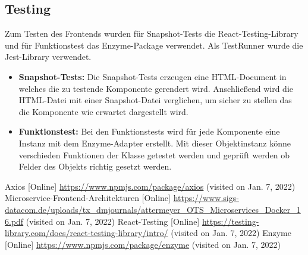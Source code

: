 \documentclass[conference]{IEEEtran}
\begin{document}
\subsection{Testing}
Zum Testen des Frontends wurden für Snapshot-Tests die React-Testing-Library\cite{reactTest} und für Funktionstest das Enzyme-Package\cite{enzyme} verwendet. 
Als TestRunner wurde die Jest-Library verwendet.

\begin{itemize}
    \item \textbf{Snapshot-Tests:}
    Die Snapshot-Tests erzeugen eine HTML-Document in welches die zu testende Komponente gerendert wird.
    Anschließend wird die HTML-Datei mit einer Snapshot-Datei verglichen, um sicher zu stellen das die Komponente wie erwartet dargestellt wird.
    \item \textbf{Funktionstest:}
    Bei den Funktionstests wird für jede Komponente eine Instanz mit dem Enzyme-Adapter erstellt.
    Mit dieser Objektinstanz könne verschieden Funktionen der Klasse getestet werden und geprüft werden ob Felder des Objekts richtig gesetzt werden.
\end{itemize}



\begin{thebibliography}{0}
	Axios [Online] \url{https://www.npmjs.com/package/axios} (visited on Jan. 7, 2022)
    Microservice-Frontend-Architekturen [Online] \url{https://www.sigs-datacom.de/uploads/tx_dmjournals/attermeyer_OTS_Microservices_Docker_16.pdf} (visited on Jan. 7, 2022)
    React-Testing [Online] \url{https://testing-library.com/docs/react-testing-library/intro/} (visited on Jan. 7, 2022)
    Enzyme [Online] \url{https://www.npmjs.com/package/enzyme} (visited on Jan. 7, 2022)  
\end{thebibliography}
\end{document}
